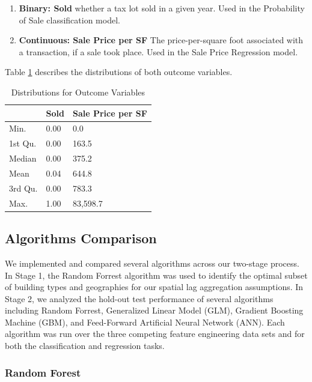 \documentclass[12pt,]{article}
\providecommand{\tightlist}{%
  \setlength{\itemsep}{0pt}\setlength{\parskip}{0pt}}
\begin{document}
\begin{enumerate}
\def\labelenumi{\arabic{enumi})}
\tightlist
\item
  \textbf{Binary: Sold} whether a tax lot sold in a given year. Used in
  the Probability of Sale classification model.
\item
  \textbf{Continuous: Sale Price per SF} The price-per-square foot
  associated with a transaction, if a sale took place. Used in the Sale
  Price Regression model.
\end{enumerate}

\noindent Table \ref{tab:OutcomeDistro} describes the distributions of
both outcome variables.

\begin{table}

\caption{\label{tab:table 4}\label{tab:OutcomeDistro} Distributions for Outcome Variables}
\centering
\begin{tabular}[t]{lll}
\toprule
  & Sold & Sale Price per SF\\
\midrule
Min. & 0.00 & 0.0\\
1st Qu. & 0.00 & 163.5\\
Median & 0.00 & 375.2\\
Mean & 0.04 & 644.8\\
3rd Qu. & 0.00 & 783.3\\
Max. & 1.00 & 83,598.7\\
\bottomrule
\end{tabular}
\end{table}

\hypertarget{algorithms-comparison}{%
\subsection{Algorithms Comparison}\label{algorithms-comparison}}

We implemented and compared several algorithms across our two-stage
process. In Stage 1, the Random Forrest algorithm was used to identify
the optimal subset of building types and geographies for our spatial lag
aggregation assumptions. In Stage 2, we analyzed the hold-out test
performance of several algorithms including Random Forrest, Generalized
Linear Model (GLM), Gradient Boosting Machine (GBM), and Feed-Forward
Artificial Neural Network (ANN). Each algorithm was run over the three
competing feature engineering data sets and for both the classification
and regression tasks.

\hypertarget{random-forest}{%
\subsubsection{Random Forest}\label{random-forest}}
\end{document}
